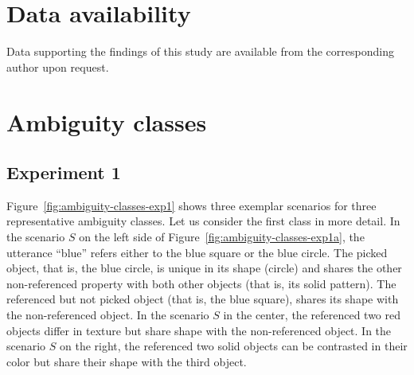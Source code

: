 \documentclass[11pt,a4paper]{article}
\begin{document}
\section*{Data availability}
Data supporting the findings of this study are available from the corresponding author upon request.


\setlength{\bibleftmargin}{.125in}
\setlength{\bibindent}{-\bibleftmargin}



\cleardoublepage

\appendix

\section{Ambiguity classes}

\subsection*{Experiment 1}

Figure~\ref{fig:ambiguity-classes-exp1} shows three exemplar scenarios for three representative ambiguity classes. 
Let us consider the first class in more detail.
In the scenario $S$ on the left side of Figure~\ref{fig:ambiguity-classes-exp1a}, 
the utterance ``blue'' refers either to the blue square or the blue circle.
The picked object, that is, the blue circle, is unique in its shape (circle) and shares the other non-referenced property with both other objects (that is, its solid pattern). 
The referenced but not picked object (that is, the blue square), shares its shape with the non-referenced object. 
In the scenario $S$ in the center, the referenced two red objects differ in texture but share shape with the non-referenced object.
In the scenario $S$ on the right, the referenced two solid objects can be contrasted in their color but share their shape with the third object.
\end{document}
